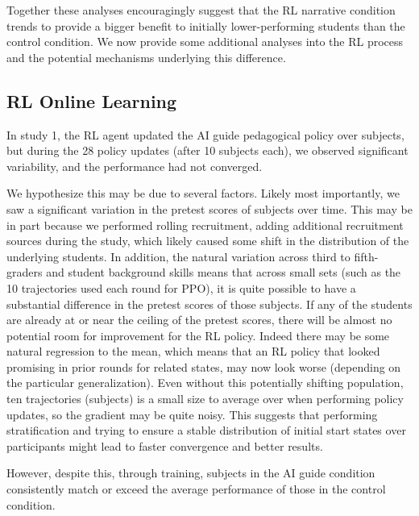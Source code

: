 \documentclass[sn-mathphys,Numbered]{sn-jnl}%
\theoremstyle{thmstyleone}%
\theoremstyle{thmstyletwo}%
\theoremstyle{thmstylethree}%
\begin{document}
Together these analyses encouragingly suggest that the RL narrative condition trends to provide a bigger benefit to initially lower-performing students than the control condition. 
We now provide some additional analyses into the RL process and the potential mechanisms underlying this difference. 

\subsection{RL Online Learning}


In study 1, the RL agent updated the AI guide pedagogical policy over subjects, but during the 28 policy updates (after 10 subjects each), we observed significant variability, and the performance had not converged. 

We hypothesize this may be due to several factors. Likely most importantly, we saw a significant variation in the pretest scores of subjects over time. This may be in part because we performed rolling recruitment, adding additional recruitment sources during the study, which likely caused some shift in the distribution of the underlying students. In addition, the natural variation across third to fifth-graders and student background skills means that across small sets (such as the 10 trajectories used each round for PPO), it is quite possible to have a substantial difference in the pretest scores of those subjects. If any of the students are already at or near the ceiling of the pretest scores, there will be almost no potential room for improvement for the RL policy. Indeed there may be some natural regression to the mean, which means that an RL policy that looked promising in prior rounds for related states, may now look worse (depending on the particular generalization). Even without this potentially shifting population, ten trajectories (subjects) is a small size to average over when performing policy updates, so the gradient may be quite noisy. This suggests that performing stratification and trying to ensure a stable distribution of initial start states over participants might lead to faster convergence and better results. 

However, despite this, through training, subjects in the AI guide condition consistently match or exceed the average performance of those in the control condition.  
\end{document}
